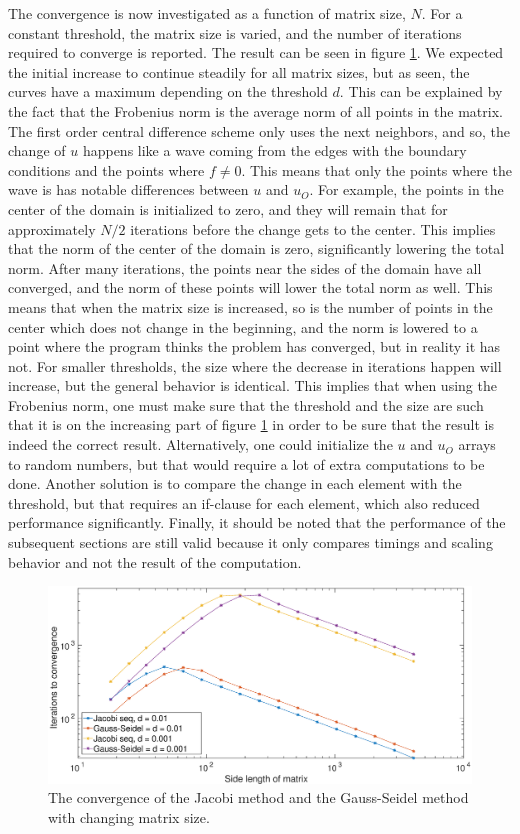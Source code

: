 The convergence is now investigated as a function of matrix size, $N$. For a constant threshold, the matrix size is varied, and the number of iterations required to converge is reported. The result can be seen in figure \ref{fig:itN}. We expected the initial increase to continue steadily for all matrix sizes, but as seen, the curves have a maximum depending on the threshold $d$. This can be explained by the fact that the Frobenius norm is the average norm of all points in the matrix. The first order central difference scheme only uses the next neighbors, and so, the change of $u$ happens like a wave coming from the edges with the boundary conditions and the points where $f \neq 0$. This means that only the points where the wave is has notable differences between $u$ and $u_O$. For example, the points in the center of the domain is initialized to zero, and they will remain that for approximately $N/2$ iterations before the change gets to the center. This implies that the norm of the center of the domain is zero, significantly lowering the total norm. After many iterations, the points near the sides of the domain have all converged, and the norm of these points will lower the total norm as well. This means that when the matrix size is increased, so is the number of points in the center which does not change in the beginning, and the norm is lowered to a point where the program thinks the problem has converged, but in reality it has not. For smaller thresholds, the size where the decrease in iterations happen will increase, but the general behavior is identical. This implies that when using the Frobenius norm, one must make sure that the threshold and the size are such that it is on the increasing part of figure \ref{fig:itN} in order to be sure that the result is indeed the correct result. Alternatively, one could initialize the $u$ and $u_O$ arrays to random numbers, but that would require a lot of extra computations to be done. Another solution is to compare the change in each element with the threshold, but that requires an if-clause for each element, which also reduced performance significantly. Finally, it should be noted that the performance of the subsequent sections are still valid because it only compares timings and scaling behavior and not the result of the computation.

\begin{figure}
\centering
\includegraphics[width = 1.1\textwidth]{fig/itN.eps}
\caption{The convergence of the Jacobi method and the Gauss-Seidel method with changing matrix size.}
\label{fig:itN}
\end{figure}

